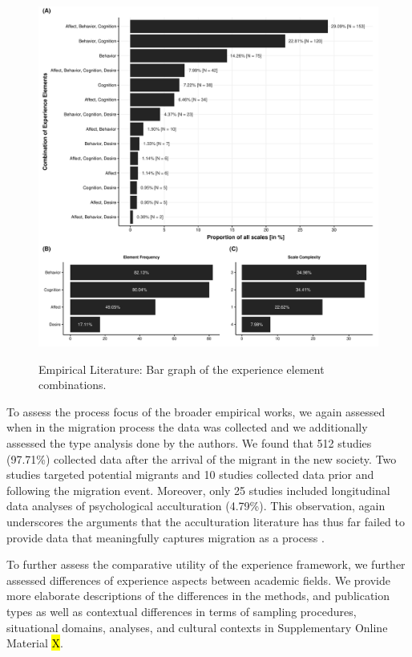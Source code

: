 \begin{figure}[h]
\centering
\caption{Empirical Literature: Bar graph of the experience element combinations.}
\includegraphics[width=\textwidth]{Figures/EmpPlotFreq-1}
\label{fig:EmpPlotFreq-1}
\end{figure}



To assess the process focus of the broader empirical works, we again
assessed when in the migration process the data was collected and we
additionally assessed the type analysis done by the authors. We found
that 512 studies (97.71\%) collected data after the arrival of the
migrant in the new society. Two studies targeted potential migrants and
10 studies collected data prior and following the migration event.
Moreover, only 25 studies included longitudinal data analyses of
psychological acculturation (4.79\%). This observation, again
underscores the arguments that the acculturation literature has thus far
failed to provide data that meaningfully captures migration as a process
\citep[e.g.,][]{Brown2011, Ward2019}.

To further assess the comparative utility of the experience framework,
we further assessed differences of experience aspects between academic
fields. We provide more elaborate descriptions of the differences in the
methods, and publication types as well as contextual differences in
terms of sampling procedures, situational domains, analyses, and
cultural contexts in Supplementary Online Material \hl{X}.

